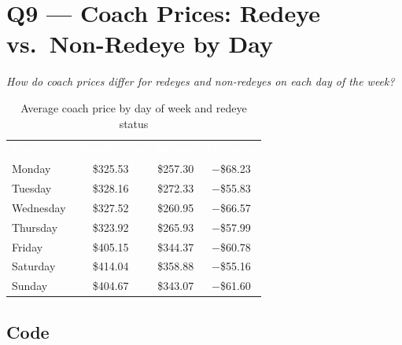 \documentclass[12pt, a4paper]{report}
\newcommand{\thead}[1]{\cellcolor{themeHeaderBg}\textcolor{white}{\textbf{#1}}}
\newcommand{\talt}{\rowcolor{themeRowAlt}}
\newcommand{\trow}{\rowcolor{white}}
\begin{document}
\chapter{Q9 — Coach Prices: Redeye vs.\ Non-Redeye by Day}

\textit{How do coach prices differ for redeyes and non-redeyes on each day of the week?}

\begin{table}[H]
\centering
\renewcommand{\arraystretch}{1.3}
\begin{tabular}{lccc}
\thead{Day} & \thead{Non-Redeye} & \thead{Redeye} & \thead{Discount} \\
\talt Monday    & \$325.53 & \$257.30 & $-$\$68.23 \\
\trow Tuesday   & \$328.16 & \$272.33 & $-$\$55.83 \\
\talt Wednesday & \$327.52 & \$260.95 & $-$\$66.57 \\
\trow Thursday  & \$323.92 & \$265.93 & $-$\$57.99 \\
\talt Friday    & \$405.15 & \$344.37 & $-$\$60.78 \\
\trow Saturday  & \$414.04 & \$358.88 & $-$\$55.16 \\
\talt Sunday    & \$404.67 & \$343.07 & $-$\$61.60 \\
\end{tabular}
\caption{Average coach price by day of week and redeye status}
\end{table}

\section{Code}
\end{document}
